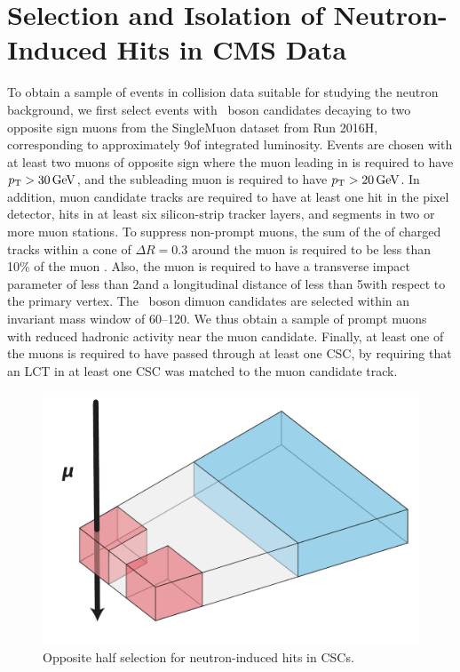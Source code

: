 \section{Selection and Isolation of Neutron-Induced Hits in CMS Data}
\label{sec:selection}
To obtain a sample of events in \pp collision data suitable for studying the neutron background, we first select events with \PZ\ boson candidates decaying to two opposite sign muons from the SingleMuon dataset from Run 2016H, corresponding to approximately 9\fbinv of integrated luminosity. Events are chosen with at least two muons of opposite sign where the muon leading in \pt is required to have $p_{\mathrm{T}} > 30\,\text{Ge\hspace{-.08em}V}$, and the subleading muon is required to have $p_{\mathrm{T}} > 20\,\text{Ge\hspace{-.08em}V}$. In addition, muon candidate tracks are required to have at least one hit in the pixel detector, hits in at least six silicon-strip tracker layers, and segments in two or more muon stations. To suppress non-prompt muons, the sum of the \pt of charged tracks within a cone of $\Delta R=0.3$ around the muon is required to be less than 10\% of the muon \pt. Also, the muon is required to have a transverse impact parameter of less than 2\mm and a longitudinal distance of less than 5\mm with respect to the primary vertex. The \PZ\ boson dimuon candidates are selected within an invariant mass window of 60--120\GeV. We thus obtain a sample of prompt muons with reduced hadronic activity near the muon candidate. Finally, at least one of the muons is required to have passed through at least one CSC, by requiring that an LCT in at least one CSC was matched to the muon candidate track.

\begin{figure}[htbp]
	\centering
	\includegraphics[width=\dummyFigWidth]{figures/neutron/CornerSelection.pdf}
	\caption{Opposite half selection for neutron-induced hits in CSCs.}
	\label{fig:corner}
\end{figure}

